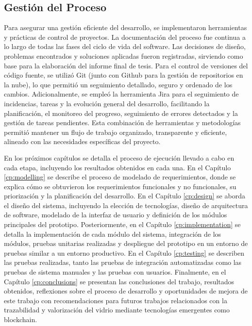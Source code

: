 \subsection{Gestión del Proceso}

Para asegurar una gestión eficiente del desarrollo, se implementaron herramientas y prácticas de control de proyectos. La documentación del proceso fue continua a lo largo de todas las fases del ciclo de vida del software. Las decisiones de diseño, problemas encontrados y soluciones aplicadas fueron registradas, sirviendo como base para la elaboración del informe final de tesis. Para el control de versiones del código fuente, se utilizó Git (junto con Github para la gestión de repositorios en la nube), lo que permitió un seguimiento detallado, seguro y ordenado de los cambios. Adicionalmente, se empleó la herramienta Jira para el seguimiento de incidencias, tareas y la evolución general del desarrollo, facilitando la planificación, el monitoreo del progreso, seguimiento de errores detectados y la gestión de tareas pendientes. Esta combinación de herramientas y metodologías permitió mantener un flujo de trabajo organizado, transparente y eficiente, alineado con las necesidades específicas del proyecto.

En los próximos capítulos se detalla el proceso de ejecución llevado a cabo en cada etapa, incluyendo los resultados obtenidos en cada una. En el Capítulo \ref{cp:modelling} se describe el proceso de modelado de requerimientos, donde se explica cómo se obtuvieron los requerimientos funcionales y no funcionales, su priorización y la planificación del desarrollo. En el Capítulo \ref{cp:design} se aborda el diseño del sistema, incluyendo la elección de tecnologías, diseño de arquitectura de software, modelado de la interfaz de usuario y definición de los módulos principales del prototipo. Posteriormente, en el Capítulo \ref{cp:implementation} se detalla la implementación de cada módulo del sistema, integración de los módulos, pruebas unitarias realizadas y despliegue del prototipo en un entorno de pruebas similar a un entorno productivo. En el Capítulo \ref{cp:testing} se describen las pruebas realizadas, tanto las pruebas de integración automatizadas como las pruebas de sistema manuales y las pruebas con usuarios. Finalmente, en el Capítulo \ref{cp:conclusions} se presentan las conclusiones del trabajo, resultados obtenidos, reflexiones sobre el proceso de desarrollo y oportunidades de mejora de este trabajo con recomendaciones para futuros trabajos relacionados con la trazabilidad y valorización del vidrio mediante tecnologías emergentes como blockchain.
